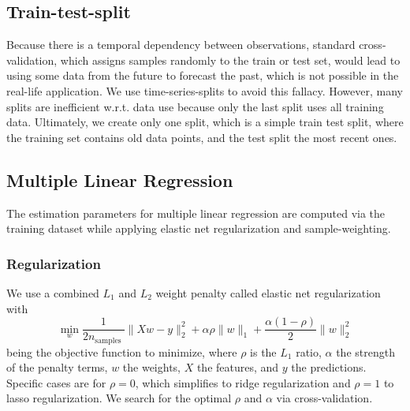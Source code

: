 \documentclass[conference]{IEEEtran}
\begin{document}
\subsection{Train-test-split}
Because there is a temporal dependency between observations, standard cross-validation, which assigns samples randomly to the train or test set, would lead to using some data from the future to forecast the past, which is not possible in the real-life application. 
We use time-series-splits to avoid this fallacy. However, many splits are inefficient w.r.t. data use because only the last split uses all training data. Ultimately, we create only one split, which is a simple train test split, where the training set contains old data points, and the test split the most recent ones.



\subsection{Multiple Linear Regression}
The estimation parameters for multiple linear regression are computed via the training dataset while applying elastic net regularization and sample-weighting.


\subsubsection{Regularization}
We use a combined $L_1$ and $L_2$ weight penalty called elastic net regularization\cite{zou_regularization_2005} with
\begin{equation}
\min _{w} \frac{1}{2 n_{\text {samples }}}\|X w-y\|_{2}^{2}+\alpha \rho\|w\|_{1}+\frac{\alpha(1-\rho)}{2}\|w\|_{2}^{2}
\end{equation}
being the objective function to minimize, where $\rho$ is the $L_1$ ratio, $\alpha$ the strength of the penalty terms, $w$ the weights, $X$ the features, and $y$ the predictions.
Specific cases are for $\rho=0$, which simplifies to ridge regularization and $\rho=1$ to lasso regularization. We search for the optimal $\rho$ and $\alpha$ via cross-validation.
\end{document}
